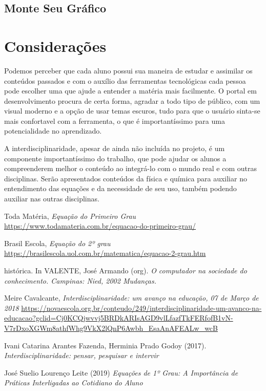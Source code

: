 \documentclass[12pt]{report}
\begin{document}
\section{Monte Seu Gráfico}
\lipsum[1]

\chapter{Considerações}
Podemos perceber que cada aluno possui sua maneira de estudar e assimilar os conteúdos passados e com o auxílio das ferramentas tecnológicas cada pessoa pode escolher uma que ajude a entender a matéria mais facilmente. O portal em desenvolvimento procura de certa forma, agradar a todo tipo de público, com um visual moderno e a opção de usar temas escuros, tudo para que o usuário sinta-se mais confortavel com a ferramenta, o que é importantíssimo para uma potencialidade no aprendizado.

A interdisciplinaridade, apesar de ainda não incluída no projeto, é um componente importantíssimo do trabalho, que pode ajudar os alunos a compreenderem melhor o conteúdo ao integrá-lo com o mundo real e com outras disciplinas. Serão apresentados conteúdos da física e química para auxiliar no entendimento das equações e da necessidade de seu uso, também podendo auxiliar nas outras disciplinas.

\begin{thebibliography}{9}

\noindent Toda Matéria, 
\textit{Equação do Primeiro Grau}
\url{https://www.todamateria.com.br/equacao-do-primeiro-grau/}

\noindent Brasil Escola, 
\textit{Equação do 2º grau}
\url{https://brasilescola.uol.com.br/matematica/equacao-2-grau.htm}

\noindent histórica. In VALENTE, José Armando (org). 
\textit{O computador na sociedade do conhecimento. Campinas: Nied, 2002 Mudanças.}

\noindent Meire Cavalcante,
\textit{Interdisciplinaridade: um avanço na educação, 07 de Março de 2018}
\url{https://novaescola.org.br/conteudo/249/interdisciplinaridade-um-avanco-na-educacao?gclid=Cj0KCQjwvvj5BRDkARIsAGD9vlLfazfTkFERfofB1vN-V7rDxoXGWm8athfWhg9VkX2lQnP6Awbh_EsaAnAFEALw_wcB}

\noindent Ivani Catarina Arantes Fazenda, Herminia Prado Godoy (2017).
\textit{Interdisciplinaridade: pensar, pesquisar e intervir}

\noindent José Suelio Lourenço Leite (2019)
\textit{Equações de 1º Grau: A Importância de Práticas Interligadas ao Cotidiano do Aluno}

\end{thebibliography}
\end{document}
